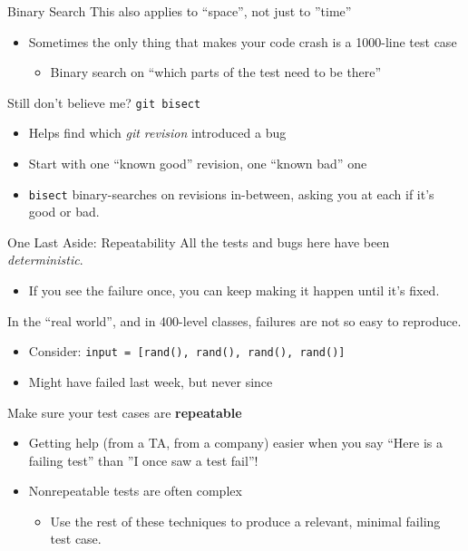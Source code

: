 \documentclass[xcolor=dvipsnames]{beamer}
\begin{document}
\begin{frame}{Binary Search}
	This also applies to ``space'', not just to ''time''
	\begin{itemize}
		\item Sometimes the only thing that makes your code crash is a 1000-line test case
		\begin{itemize}
			\item Binary search on ``which parts of the test need to be there''
		\end{itemize}
	\end{itemize}
	\pause
	\linegap
	Still don't believe me? \texttt{git bisect}
	\begin{itemize}
		\item Helps find which {\em git revision} introduced a bug
		\item Start with one ``known good'' revision, one ``known bad'' one
		\item \texttt{bisect} binary-searches on revisions in-between, asking you at each if it's good or bad.
	\end{itemize}
\end{frame}

\begin{frame}{One Last Aside: Repeatability}
	All the tests and bugs here have been {\em deterministic}.
	\begin{itemize}
		\item If you see the failure once, you can keep making it happen until it's fixed.
	\end{itemize}
	\pause
	\linegap

	In the ``real world'', and in 400-level classes, failures are not so easy to reproduce.
	\begin{itemize}
		\item Consider: \texttt{input = [rand(), rand(), rand(), rand()]}
		\item Might have failed last week, but never since
	\end{itemize}
	\pause
	\linegap
	Make sure your test cases are {\bf repeatable}
	\begin{itemize}
		\item Getting help (from a TA, from a company) easier when you say ``Here is a failing test'' than ''I once saw a test fail''!
		\item Nonrepeatable tests are often complex
		\begin{itemize}
			\item Use the rest of these techniques to produce a relevant, minimal failing test case.
		\end{itemize}
	\end{itemize}
\end{frame}
\end{document}
